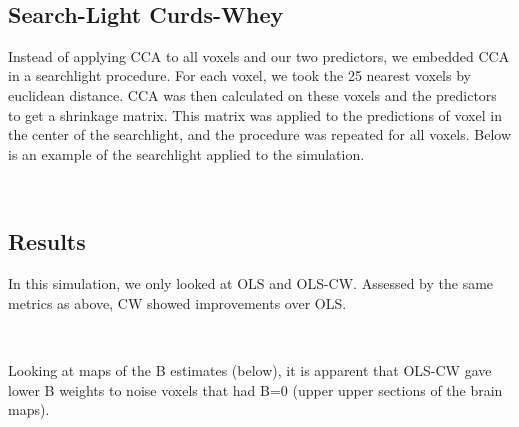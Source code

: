 \documentclass{article}
\begin{document}
        
    \begin{center}
    \end{center}
    { \hspace*{\fill} \\}
    
    \subsection{Search-Light Curds-Whey}\label{search-light-curds-whey}

Instead of applying CCA to all voxels and our two predictors, we
embedded CCA in a searchlight procedure. For each voxel, we took the 25
nearest voxels by euclidean distance. CCA was then calculated on these
voxels and the predictors to get a shrinkage matrix. This matrix was
applied to the predictions of voxel in the center of the searchlight,
and the procedure was repeated for all voxels. Below is an example of
the searchlight applied to the simulation.


    \begin{center}
    \end{center}
    { \hspace*{\fill} \\}
    
    \subsection{Results}\label{results}

In this simulation, we only looked at OLS and OLS-CW. Assessed by the
same metrics as above, CW showed improvements over OLS.



    \begin{center}
    \end{center}
    { \hspace*{\fill} \\}
    
    Looking at maps of the B estimates (below), it is apparent that OLS-CW
gave lower B weights to noise voxels that had B=0 (upper upper sections
of the brain maps).


    \begin{center}
    \end{center}
    { \hspace*{\fill} \\}
    
\end{document}
